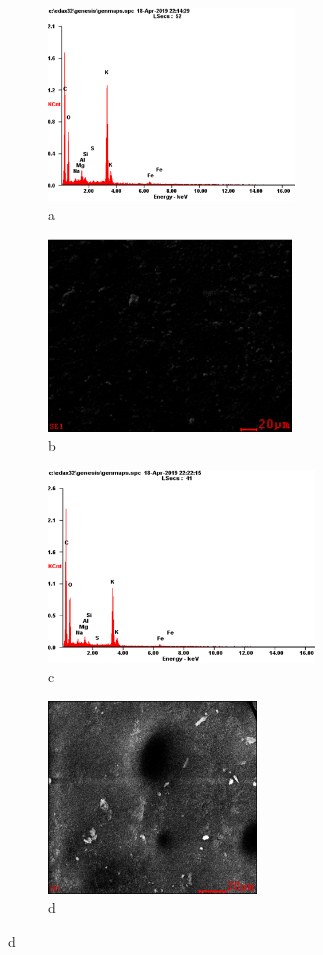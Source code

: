 \begin{figure}[H]
    \centering
    \begin{subfigure}[t]{0.45\textwidth}
        \centering
        \includegraphics[height=5.1cm]{media/chem2/image87}
        \caption*{a}
    \end{subfigure}
    \begin{subfigure}[t]{0.45\textwidth}
        \centering
        \includegraphics[height=5.1cm]{media/chem2/image88}
        \caption*{b}
    \end{subfigure}
    
    \begin{subfigure}[t]{0.45\textwidth}
        \centering
        \includegraphics[height=5.1cm]{media/chem2/image89}
        \caption*{c}
    \end{subfigure}
    \begin{subfigure}[t]{0.45\textwidth}
        \centering
        \includegraphics[height=5.1cm]{media/chem2/image90}
        \caption*{d}
    \end{subfigure}
    

\end{figure}
